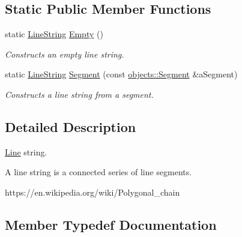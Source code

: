\subsection*{Static Public Member Functions}
\begin{DoxyCompactItemize}
\item 
static \hyperlink{classostk_1_1math_1_1geom_1_1d2_1_1objects_1_1_line_string}{Line\+String} \hyperlink{classostk_1_1math_1_1geom_1_1d2_1_1objects_1_1_line_string_a3557befd15577368d8cc2f9c2a74dfec}{Empty} ()
\begin{DoxyCompactList}\small\item\em Constructs an empty line string. \end{DoxyCompactList}\item 
static \hyperlink{classostk_1_1math_1_1geom_1_1d2_1_1objects_1_1_line_string}{Line\+String} \hyperlink{classostk_1_1math_1_1geom_1_1d2_1_1objects_1_1_line_string_ab95e87bd77782e0a3d50bcd4866d0ec4}{Segment} (const \hyperlink{classostk_1_1math_1_1geom_1_1d2_1_1objects_1_1_segment}{objects\+::\+Segment} \&a\+Segment)
\begin{DoxyCompactList}\small\item\em Constructs a line string from a segment. \end{DoxyCompactList}\end{DoxyCompactItemize}


\subsection{Detailed Description}
\hyperlink{classostk_1_1math_1_1geom_1_1d2_1_1objects_1_1_line}{Line} string. 

A line string is a connected series of line segments.

https\+://en.wikipedia.\+org/wiki/\+Polygonal\+\_\+chain 

\subsection{Member Typedef Documentation}
\mbox{\label{classostk_1_1math_1_1geom_1_1d2_1_1objects_1_1_line_string_a29e6326c716bef2ec438534cfdc1e118}} 
